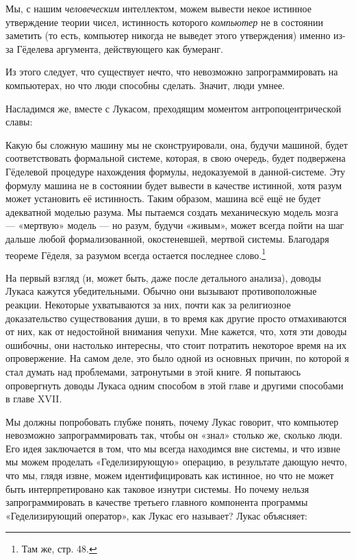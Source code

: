 \documentclass[../main.tex]{subfiles}
\begin{document}
Мы, с нашим \emph{человеческим} интеллектом, можем вывести некое истинное утверждение теории чисел, истинность которого \emph{компьютер} не в состоянии заметить (то есть, компьютер никогда не выведет этого утверждения) именно из-за Гёделева аргумента, действующего как бумеранг.

Из этого следует, что существует нечто, что невозможно запрограммировать на компьютерах, но что люди способны сделать. Значит, люди умнее.

Насладимся же, вместе с Лукасом, преходящим моментом антропоцентрической славы:

Какую бы сложную машину мы не сконструировали, она, будучи машиной, будет соответствовать формальной системе, которая, в свою очередь, будет подвержена Гёделевой процедуре нахождения формулы, недоказуемой в данной-системе. Эту формулу машина не в состоянии будет вывести в качестве истинной, хотя разум может установить её истинность. Таким образом, машина всё ещё не будет адекватной моделью разума. Мы пытаемся создать механическую модель мозга --- «мертвую» модель --- но разум, будучи «живым», может всегда пойти на шаг дальше любой формализованной, окостеневшей, мертвой системы. Благодаря теореме Гёделя, за разумом всегда остается последнее слово.\footnote{Там же, стр. 48.}

На первый взгляд (и, может быть, даже после детального анализа), доводы Лукаса кажутся убедительными. Обычно они вызывают противоположные реакции. Некоторые ухватываются за них, почти как за религиозное доказательство существования души, в то время как другие просто отмахиваются от них, как от недостойной внимания чепухи. Мне кажется, что, хотя эти доводы ошибочны, они настолько интересны, что стоит потратить некоторое время на их опровержение. На самом деле, это было одной из основных причин, по которой я стал думать над проблемами, затронутыми в этой книге. Я попытаюсь опровергнуть доводы Лукаса одним способом в этой главе и другими способами в главе XVII.

Мы должны попробовать глубже понять, почему Лукас говорит, что компьютер невозможно запрограммировать так, чтобы он «знал» столько же, сколько люди. Его идея заключается в том, что мы всегда находимся вне системы, и что извне мы можем проделать «Геделизирующую» операцию, в результате дающую нечто, что мы, глядя извне, можем идентифицировать как истинное, но что не может быть интерпретировано как таковое изнутри системы. Но почему нельзя запрограммировать в качестве третьего главного компонента программы «Геделизирующий оператор», как Лукас его называет? Лукас объясняет:
\end{document}
